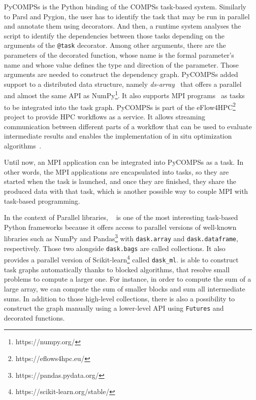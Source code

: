 PyCOMPSs\cite{tejedor2017pycompss, ramoncortes_programming_2020_pycompss} is the Python binding of the COMPSs\cite{tejedor_compss} task-based system. 
Similarly to Parsl and Pygion, the user has to identify the task that may be run in parallel and annotate them using decorators. And then, a runtime system analyses the script to identify the dependencies between those tasks depending on the arguments of the \texttt{@task} decorator. Among other arguments, there are the parameters of the decorated function, whose name is the formal parameter’s name and whose value defines the type and direction of the parameter. Those arguments are needed to construct the dependency graph. 
PyCOMPSs added support to a distributed data structure, namely \textit{ds-array}~\cite{cidfuentes_dislib_2019_pycompss} that offers a parallel and almost the same API as NumPy\footnote{https://numpy.org/}. 
It also supports MPI programs~\cite{elshazly_performance_2020_pycompss} as tasks to be integrated into the task graph. 
PyCOMPSs is part of the eFlow4HPC\footnote{https://eflows4hpc.eu/} project to provide HPC workflows as a service. It allows streaming communication between different parts of a workflow that can be used to evaluate intermediate results and enables the implementation of in situ optimization algorithms~\cite{ejarque_enabling_2022}. 

Until now, an MPI application can be integrated into PyCOMPSs as a task. In other words, the MPI applications are encapsulated into tasks, so they are started when the task is launched, and once they are finished, they share the produced data with that task, which is another possible way to couple MPI with task-based programming.

In the context of Parallel libraries, \dask~\cite{rocklin_dask_2015} is one of the most interesting task-based Python frameworks because it offers access to parallel versions of well-known libraries such as NumPy and Pandas\footnote{https://pandas.pydata.org/} with \texttt{dask.array} and \texttt{dask.dataframe}, respectively. 
Those two alongside \texttt{dask.bags} are called collections. It also provides a parallel version of Scikit-learn\footnote{https://scikit-learn.org/stable/} called \texttt{dask\_ml}. 
\dask is able to construct task graphs automatically thanks to blocked algorithms, that resolve small problems to compute a larger one. For instance, in order to compute the sum of a large array, we can compute the sum of smaller blocks and sum all intermediate sums.
In addition to those high-level collections, there is also a possibility to construct the graph manually using a lower-level API using \texttt{Futures} and decorated functions. 

